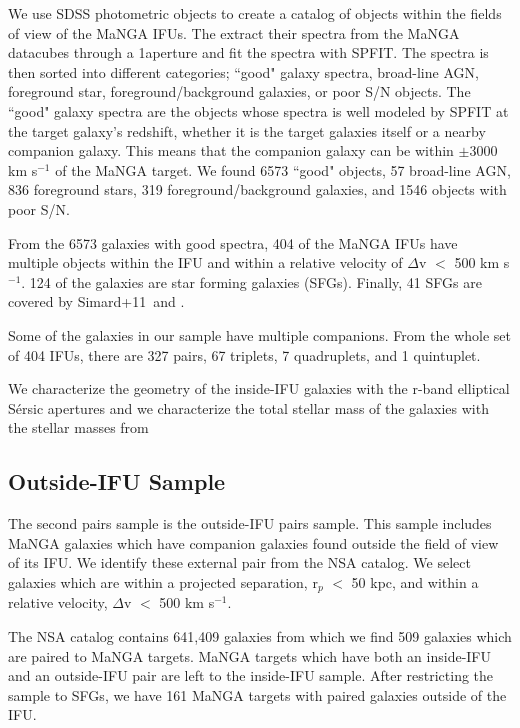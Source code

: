 \documentclass[iop,revtex4,twocolumn,apj,numberedappendix,appendixfloats]{emulateapj}
\newcommand{\simard}{Simard+11}
\begin{document}
We use SDSS photometric objects to create a catalog of objects within the fields of view of the MaNGA IFUs. The extract their spectra from the MaNGA datacubes through a 1\arcsec aperture and fit the spectra with {\sc SPFIT}. The spectra is then sorted into different categories; ``good" galaxy spectra, broad-line AGN, foreground star, foreground/background galaxies, or poor S/N objects. The ``good" galaxy spectra are the objects whose spectra is well modeled by {\sc SPFIT} at the target galaxy's redshift, whether it is the target galaxies itself or a nearby companion galaxy. This means that the companion galaxy can be within $\pm$3000 km s$^{-1}$ of the MaNGA target. We found 6573 ``good" objects, 57 broad-line AGN, 836 foreground stars, 319 foreground/background galaxies, and 1546 objects with poor S/N. 

From the 6573 galaxies with good spectra, 404 of the MaNGA IFUs have multiple objects within the IFU and within a relative velocity of $\Delta$v $<$ 500 km s$^{-1}$. 124 of the galaxies are star forming galaxies (SFGs). Finally, 41 SFGs are covered by \simard\ and \citet{Mendel:2014}. 

Some of the galaxies in our sample have multiple companions. From the whole set of 404 IFUs, there are 327 pairs, 67 triplets, 7 quadruplets, and 1 quintuplet.  

We characterize the geometry of the inside-IFU galaxies with the r-band elliptical S\'ersic apertures and we characterize the total stellar mass of the galaxies with the stellar masses from \citet{Mendel:2014}


\subsection{Outside-IFU Sample}\label{sec:outside}

The second pairs sample is the outside-IFU pairs sample. This sample includes MaNGA galaxies which have companion galaxies found outside the field of view of its IFU. We identify these external pair from the NSA catalog. We select galaxies which are within a projected separation, r$_p$ $<$ 50 kpc, and within a relative velocity, $\Delta$v $<$ 500 km s$^{-1}$. 

The NSA catalog contains 641,409 galaxies from which we find 509 galaxies which are paired to MaNGA targets. MaNGA targets which have both an inside-IFU and an outside-IFU pair are left to the inside-IFU sample. After restricting the sample to SFGs, we have 161 MaNGA targets with paired galaxies outside of the IFU.
\end{document}
